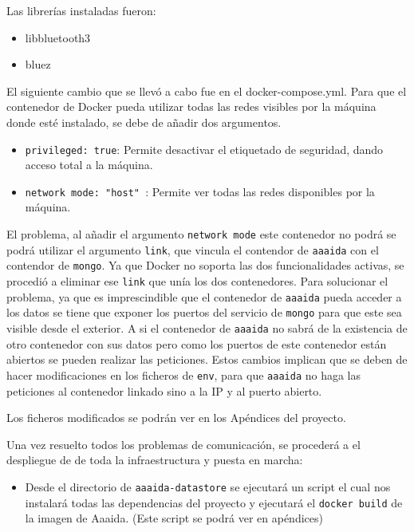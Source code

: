 Las librerías instaladas fueron:
 
\begin{itemize}
\item libbluetooth3
\item bluez
\end{itemize}

El siguiente cambio que se llevó a cabo fue en el docker-compose.yml. Para que el contenedor de Docker pueda utilizar todas las redes visibles por la máquina donde esté instalado, se debe de añadir dos argumentos.

\begin{itemize}
\item \texttt{privileged: true}: Permite desactivar el etiquetado de seguridad, dando acceso total a la máquina. 
\item \texttt{network mode: "host" }: Permite ver todas las redes disponibles por la máquina. 
\end{itemize}

El problema, al añadir el argumento \texttt{network mode} este contenedor no podrá se podrá utilizar el argumento \texttt{link}, que vincula el contendor de \texttt{aaaida} con el contendor de \texttt{mongo}.  Ya que Docker no soporta las dos funcionalidades activas, se procedió a eliminar ese \texttt{link} que unía los dos contenedores. Para solucionar el problema, ya que es imprescindible que el contenedor de \texttt{aaaida} pueda acceder a los datos se tiene que exponer los puertos del servicio de \texttt{mongo} para que este sea visible desde el exterior. A si el contenedor de \texttt{aaaida} no sabrá de la existencia de otro contenedor con sus datos pero como los puertos de este contenedor están abiertos se pueden realizar las peticiones. Estos cambios implican que se deben de hacer modificaciones en los ficheros de \texttt{env}, para que \texttt{aaaida} no haga las peticiones al contenedor linkado sino a la IP y al puerto abierto.

Los ficheros modificados se podrán ver en los Apéndices del proyecto. 

Una vez resuelto todos los problemas de comunicación, se procederá a el despliegue de de toda la infraestructura y puesta en marcha:

\begin{itemize}
\item Desde el directorio de \texttt{aaaida-datastore} se ejecutará un script el cual nos instalará todas las dependencias del proyecto y ejecutará el  \texttt{docker build} de la imagen de Aaaida. (Este script se podrá ver en apéndices) 
\end{itemize}
\pagebreak

